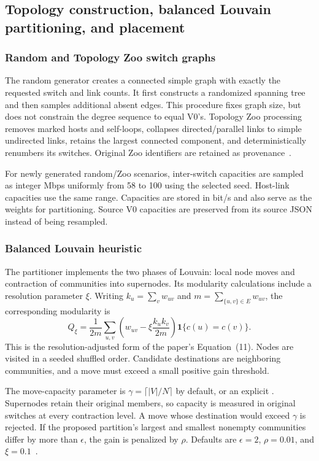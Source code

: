 \documentclass[11pt,a4paper]{article}
\newcommand{\code}[1]{\texttt{\detokenize{#1}}}
\begin{document}
\subsection{Topology construction, balanced Louvain partitioning, and placement}
\label{sec:topologies}

\subsubsection{Random and Topology Zoo switch graphs}

The random generator creates a connected simple graph with exactly the
requested switch and link counts. It first constructs a randomized spanning
tree and then samples additional absent edges. This procedure fixes graph
size, but does not constrain the degree sequence to equal V0's. Topology Zoo
processing removes marked hosts and self-loops, collapses directed/parallel
links to simple undirected links, retains the largest connected component,
and deterministically renumbers its switches. Original Zoo identifiers are
retained as provenance~\cite{code-network}.

For newly generated random/Zoo scenarios, inter-switch capacities are sampled
as integer Mbps uniformly from 58 to 100 using the selected seed. Host-link
capacities use the same range. Capacities are stored in bit/s and also serve
as the weights for partitioning. Source V0 capacities are preserved from its
source JSON instead of being resampled.

\subsubsection{Balanced Louvain heuristic}

The partitioner implements the two phases of Louvain: local node moves and
contraction of communities into supernodes. Its modularity calculations include
a resolution parameter $\xi$. Writing $k_u=\sum_v w_{uv}$ and
$m=\sum_{\{u,v\}\in E}w_{uv}$, the corresponding modularity is
\begin{equation}
 Q_\xi=\frac{1}{2m}\sum_{u,v}
 \left(w_{uv}-\xi\frac{k_uk_v}{2m}\right)
 \mathbf{1}\{c(u)=c(v)\}.
\end{equation}
This is the resolution-adjusted form of the paper's Equation~(11). Nodes are
visited in a seeded shuffled order. Candidate destinations are neighboring
communities, and a move must exceed a small positive gain threshold.

The move-capacity parameter is $\gamma=\lceil |V|/N\rceil$ by default, or an
explicit \code{LOUVAIN_CAPACITY}. Supernodes retain their original members, so
capacity is measured in original switches at every contraction level. A move
whose destination would exceed $\gamma$ is rejected. If the proposed partition's
largest and smallest nonempty communities differ by more than $\epsilon$, the
gain is penalized by $\rho$. Defaults are $\epsilon=2$, $\rho=0.01$, and
$\xi=0.1$~\cite{code-network,code-settings}.
\end{document}
